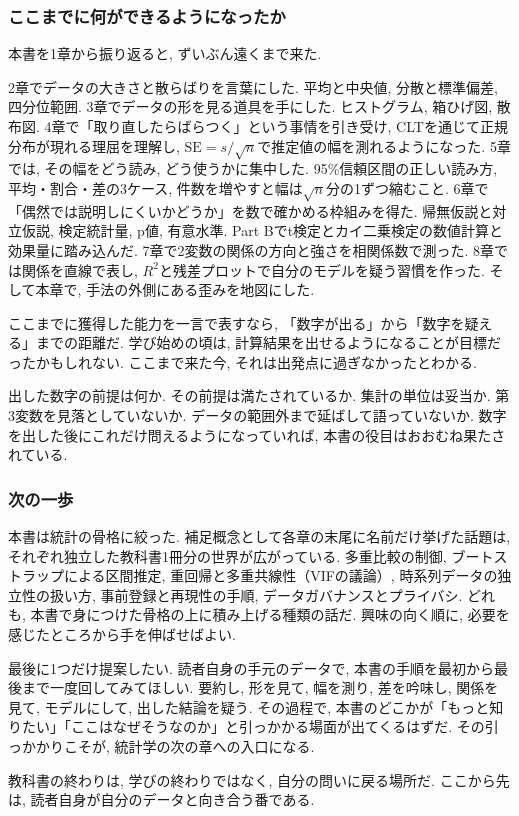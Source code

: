 \subsubsection*{ここまでに何ができるようになったか}

本書を1章から振り返ると, ずいぶん遠くまで来た.

2章でデータの大きさと散らばりを言葉にした. 平均と中央値, 分散と標準偏差, 四分位範囲.
3章でデータの形を見る道具を手にした. ヒストグラム, 箱ひげ図, 散布図.
4章で「取り直したらばらつく」という事情を引き受け, CLTを通じて正規分布が現れる理屈を理解し, $\mathrm{SE} = s/\sqrt{n}$で推定値の幅を測れるようになった.
5章では, その幅をどう読み, どう使うかに集中した. 95\%信頼区間の正しい読み方, 平均・割合・差の3ケース, 件数を増やすと幅は$\sqrt{n}$分の1ずつ縮むこと.
6章で「偶然では説明しにくいかどうか」を数で確かめる枠組みを得た. 帰無仮説と対立仮説, 検定統計量, p値, 有意水準. Part Bでt検定とカイ二乗検定の数値計算と効果量に踏み込んだ.
7章で2変数の関係の方向と強さを相関係数で測った.
8章では関係を直線で表し, $R^2$と残差プロットで自分のモデルを疑う習慣を作った.
そして本章で, 手法の外側にある歪みを地図にした.

ここまでに獲得した能力を一言で表すなら, 「数字が出る」から「数字を疑える」までの距離だ.
学び始めの頃は, 計算結果を出せるようになることが目標だったかもしれない.
ここまで来た今, それは出発点に過ぎなかったとわかる.

出した数字の前提は何か. その前提は満たされているか. 集計の単位は妥当か. 第3変数を見落としていないか. データの範囲外まで延ばして語っていないか.
数字を出した後にこれだけ問えるようになっていれば, 本書の役目はおおむね果たされている.

\subsubsection*{次の一歩}

本書は統計の骨格に絞った.
補足概念として各章の末尾に名前だけ挙げた話題は, それぞれ独立した教科書1冊分の世界が広がっている.
多重比較の制御, ブートストラップによる区間推定, 重回帰と多重共線性（VIFの議論）, 時系列データの独立性の扱い方, 事前登録と再現性の手順, データガバナンスとプライバシ.
どれも, 本書で身につけた骨格の上に積み上げる種類の話だ.
興味の向く順に, 必要を感じたところから手を伸ばせばよい.

最後に1つだけ提案したい.
読者自身の手元のデータで, 本書の手順を最初から最後まで一度回してみてほしい.
要約し, 形を見て, 幅を測り, 差を吟味し, 関係を見て, モデルにして, 出した結論を疑う.
その過程で, 本書のどこかが「もっと知りたい」「ここはなぜそうなのか」と引っかかる場面が出てくるはずだ.
その引っかかりこそが, 統計学の次の章への入口になる.

教科書の終わりは, 学びの終わりではなく, 自分の問いに戻る場所だ.
ここから先は, 読者自身が自分のデータと向き合う番である.
